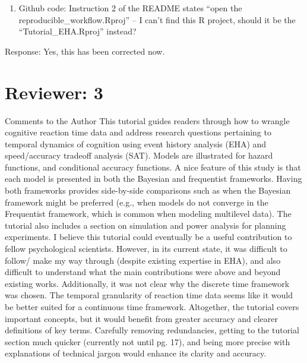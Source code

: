 \documentclass[
]{article}
\providecommand{\tightlist}{%
  \setlength{\itemsep}{0pt}\setlength{\parskip}{0pt}}
\renewenvironment{quote}{\begin{leftbar}}{\end{leftbar}}
\begin{document}
\begin{quote}
\begin{enumerate}
\def\labelenumi{\arabic{enumi}.}
\setcounter{enumi}{16}
\tightlist
\item
  Github code: Instruction 2 of the README states ``open the
  reproducible\_workflow.Rproj'' -- I can't find this R project, should
  it be the ``Tutorial\_EHA.Rproj'' instead?
\end{enumerate}
\end{quote}

Response: Yes, this has been corrected now.

\section{Reviewer: 3}\label{reviewer-3}

\begin{quote}
Comments to the Author This tutorial guides readers through how to
wrangle cognitive reaction time data and address research questions
pertaining to temporal dynamics of cognition using event history
analysis (EHA) and speed/accuracy tradeoff analysis (SAT). Models are
illustrated for hazard functions, and conditional accuracy functions. A
nice feature of this study is that each model is presented in both the
Bayesian and frequentist frameworks. Having both frameworks provides
side-by-side comparisons such as when the Bayesian framework might be
preferred (e.g., when models do not converge in the Frequentist
framework, which is common when modeling multilevel data). The tutorial
also includes a section on simulation and power analysis for planning
experiments. I believe this tutorial could eventually be a useful
contribution to fellow psychological scientists. However, in its current
state, it was difficult to follow/ make my way through (despite existing
expertise in EHA), and also difficult to understand what the main
contributions were above and beyond existing works. Additionally, it was
not clear why the discrete time framework was chosen. The temporal
granularity of reaction time data seems like it would be better suited
for a continuous time framework. Altogether, the tutorial covers
important concepts, but it would benefit from greater accuracy and
clearer definitions of key terms. Carefully removing redundancies,
getting to the tutorial section much quicker (currently not until pg.
17), and being more precise with explanations of technical jargon would
enhance its clarity and accuracy.
\end{quote}
\end{document}
